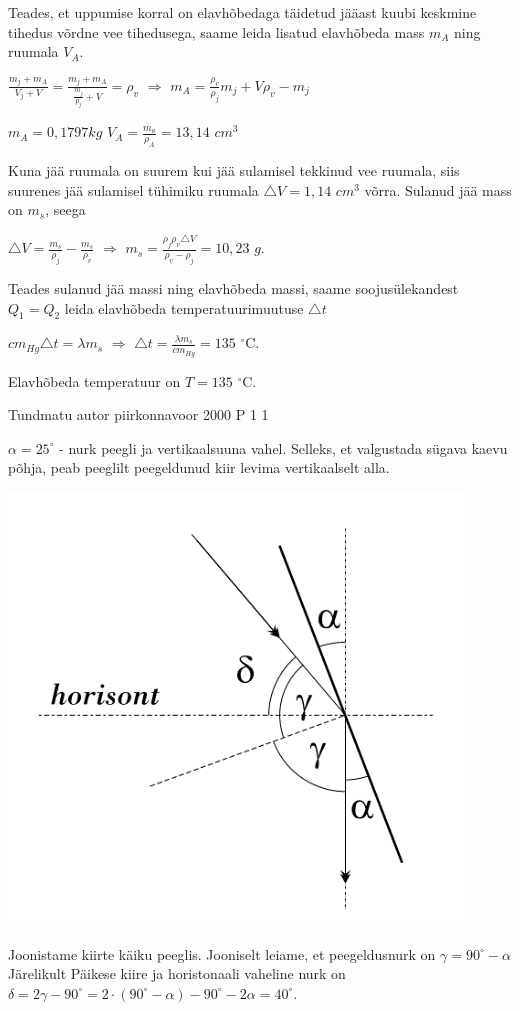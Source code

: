 \documentclass[11pt]{article}
\begin{document}
{{\ifSolution
Teades, et uppumise korral on elavhõbedaga täidetud jääast kuubi keskmine tihedus võrdne vee tihedusega, saame leida lisatud elavhõbeda mass $m_A$ ning ruumala $V_A$.
\begin{center}
$\frac{m_j + m_A}{V_j + V} = \frac{m_j + m_A}{\frac{m_j}{p_j} + V} = \rho_v$ $\Rightarrow$ $m_A = \frac{\rho_v}{\rho_j} m_j + V \rho_v - m_j$
\end{center}
\begin{center}
$m_A = 0,1797 kg$ 
$V_A = \frac{m_a}{\rho_A} = 13,14$ $cm^3$
\end{center}
Kuna jää ruumala on suurem kui jää sulamisel tekkinud vee ruumala, siis suurenes jää sulamisel tühimiku ruumala $\triangle V = 1,14$ $cm^3$ võrra. Sulanud jää mass on $m_s$, seega
\begin{center}
$\triangle V = \frac{m_s}{\rho_j} - \frac{m_s}{\rho_v}$ $\Rightarrow$ $m_s = \frac{\rho_j \rho_v \triangle V}{\rho_v - \rho_j} = 10,23$ $g$.
\end{center}
Teades sulanud jää massi ning elavhõbeda massi, saame soojusülekandest $Q_1 = Q_2$ leida elavhõbeda temperatuurimuutuse $\triangle t$
\begin{center}
$cm_{Hg} \triangle t = \lambda m_s$ $\Rightarrow$ $\triangle t = \frac{\lambda m_s}{cm_{Hg}} = 135$ $^{\circ}$C.
\end{center}
Elavhõbeda temperatuur on $T = 135$ $^{\circ}$C.
\fi
}

{Tundmatu autor} %
{piirkonnavoor} %
{2000} %
{P 1} %
{1} %
{

\ifSolution
$\alpha = 25^{\circ}$ - nurk peegli ja vertikaalsuuna vahel. Selleks, et valgustada sügava kaevu põhja, peab peeglilt peegeldunud kiir levima vertikaalselt alla.
\begin{center}
	\includegraphics[width=0.5\linewidth]{2000-v2p-01-lah.PNG}
\end{center}
Joonistame kiirte käiku peeglis. Jooniselt leiame, et peegeldusnurk on $\gamma = 90 ^{\circ} - \alpha$
Järelikult Päikese kiire ja horistonaali vaheline nurk on $\delta = 2 \gamma - 90 ^{\circ} = 2 \cdot (90 ^{\circ} - \alpha) - 90 ^{\circ} - 2 \alpha = 40 ^{\circ}$.
\fi
}

}
\end{document}
